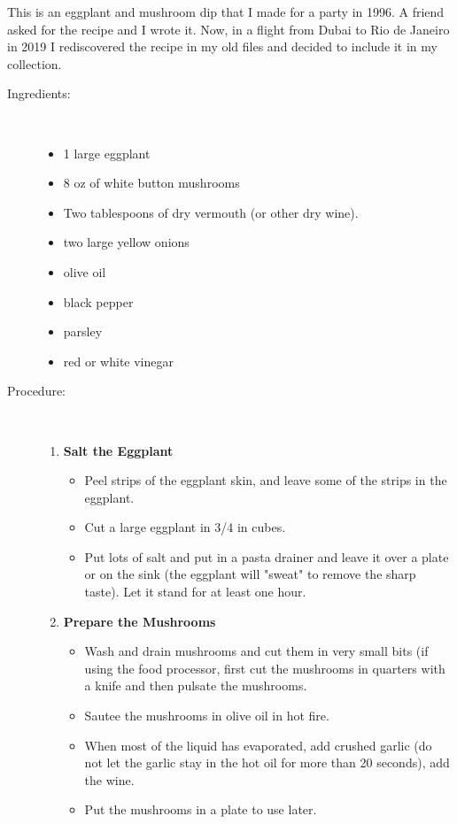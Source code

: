 \documentclass[11pt,letterpaper]{article}
\begin{document}


This is an eggplant and mushroom dip that I made for a party in 1996. A friend asked for the recipe and I wrote it. Now, in a flight from Dubai to Rio de Janeiro in 2019 I rediscovered the recipe in my old files and decided to include it in my collection.

 
\begin {description}

\item[Ingredients:]\ \\
\begin{itemize}
	\item 1 large eggplant
	\item 8 oz of white button mushrooms
	\item Two tablespoons of dry vermouth (or other dry wine).
	\item two large yellow onions
	\item olive oil
	\item black pepper
	\item parsley
	\item red or white vinegar
\end{itemize}

\item[Procedure:]\ \\

\begin{enumerate}
\item {\bf Salt the Eggplant}
\begin{itemize}
\item Peel strips of the eggplant skin, and leave some of the strips in the eggplant.
\item Cut a large eggplant in 3/4 in cubes.
\item Put lots of salt and put in a pasta drainer and leave it over a plate or on the sink (the
  eggplant will "sweat" to remove the sharp taste). Let it stand for
  at least one hour.
\end{itemize}

\item {\bf Prepare the Mushrooms}
\begin{itemize}
\item Wash and drain mushrooms and cut them in very small bits (if using the food processor, first cut the mushrooms in quarters with a knife and then pulsate the mushrooms. 
\item Sautee the mushrooms in olive oil in hot fire. 
\item When most of the liquid has evaporated, add crushed garlic (do not let the garlic stay in the
  hot oil for more than 20 seconds), add the wine.
\item Put the mushrooms in a plate to use later.
\end{itemize}


\end{enumerate}
\end{description}
\end{document}
